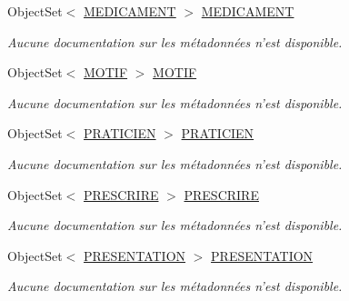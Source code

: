 \begin{DoxyCompactItemize}
Object\-Set$<$ \hyperlink{class_model_1_1_m_e_d_i_c_a_m_e_n_t}{M\-E\-D\-I\-C\-A\-M\-E\-N\-T} $>$ \hyperlink{class_model_1_1_b_d_d___s_i_o7_entities_a21a0b47c75a9adef3ef5aee8ecedbd37}{M\-E\-D\-I\-C\-A\-M\-E\-N\-T}
\begin{DoxyCompactList}\small\item\em Aucune documentation sur les métadonnées n'est disponible. \end{DoxyCompactList}\item 
Object\-Set$<$ \hyperlink{class_model_1_1_m_o_t_i_f}{M\-O\-T\-I\-F} $>$ \hyperlink{class_model_1_1_b_d_d___s_i_o7_entities_a9bf34ee977b7f671e9996967d1ff2328}{M\-O\-T\-I\-F}
\begin{DoxyCompactList}\small\item\em Aucune documentation sur les métadonnées n'est disponible. \end{DoxyCompactList}\item 
Object\-Set$<$ \hyperlink{class_model_1_1_p_r_a_t_i_c_i_e_n}{P\-R\-A\-T\-I\-C\-I\-E\-N} $>$ \hyperlink{class_model_1_1_b_d_d___s_i_o7_entities_aa7f5305d592739cf4e3805fcdb0277ae}{P\-R\-A\-T\-I\-C\-I\-E\-N}
\begin{DoxyCompactList}\small\item\em Aucune documentation sur les métadonnées n'est disponible. \end{DoxyCompactList}\item 
Object\-Set$<$ \hyperlink{class_model_1_1_p_r_e_s_c_r_i_r_e}{P\-R\-E\-S\-C\-R\-I\-R\-E} $>$ \hyperlink{class_model_1_1_b_d_d___s_i_o7_entities_a2f477606bede8c5cc3edbdddeb81ada8}{P\-R\-E\-S\-C\-R\-I\-R\-E}
\begin{DoxyCompactList}\small\item\em Aucune documentation sur les métadonnées n'est disponible. \end{DoxyCompactList}\item 
Object\-Set$<$ \hyperlink{class_model_1_1_p_r_e_s_e_n_t_a_t_i_o_n}{P\-R\-E\-S\-E\-N\-T\-A\-T\-I\-O\-N} $>$ \hyperlink{class_model_1_1_b_d_d___s_i_o7_entities_a8e445ba6656fc5fe0d0b5fa5a391689e}{P\-R\-E\-S\-E\-N\-T\-A\-T\-I\-O\-N}
\begin{DoxyCompactList}\small\item\em Aucune documentation sur les métadonnées n'est disponible. \end{DoxyCompactList}\item 

\end{DoxyCompactItemize}
